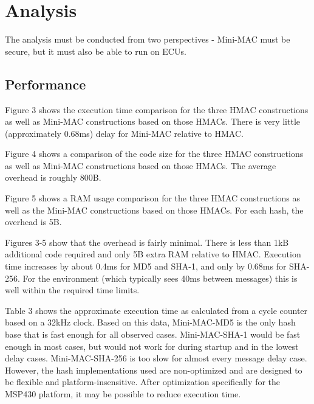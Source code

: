 \section{Analysis}
The analysis must be conducted from two perspectives - Mini-MAC must be secure, but it must also be able to run on ECUs. 

\subsection{Performance}
Figure 3 shows the execution time comparison for the three HMAC constructions as well as Mini-MAC constructions based on those HMACs. There is very little (approximately 0.68ms) delay for Mini-MAC relative to HMAC.

Figure 4 shows a comparison of the code size for the three HMAC constructions as well as Mini-MAC constructions based on those HMACs. The average overhead is roughly 800B.

Figure 5 shows a RAM usage comparison for the three HMAC constructions as well as the Mini-MAC constructions based on those HMACs. For each hash, the overhead is 5B.

Figures 3-5 show that the overhead is fairly minimal. There is less than 1kB additional code required and only 5B extra RAM relative to HMAC. Execution time increases by about 0.4ms for MD5 and SHA-1, and only by 0.68ms for SHA-256. For the environment (which typically sees 40ms between messages) this is well within the required time limits.

Table 3 shows the approximate execution time as calculated from a cycle counter based on a 32kHz clock. Based on this data, Mini-MAC-MD5 is the only hash base that is fast enough for all observed cases. Mini-MAC-SHA-1 would be fast enough in most cases, but would not work for during startup and in the lowest delay cases. Mini-MAC-SHA-256 is too slow for almost every message delay case. However, the hash implementations used are non-optimized and are designed to be flexible and platform-insensitive. After optimization specifically for the MSP430 platform, it may be possible to reduce execution time.


